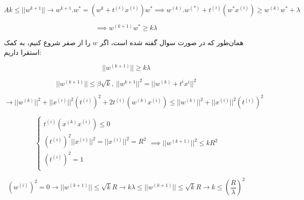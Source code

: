 
$$
Ak \leq ||w^{k + 1}|| \rightarrow w^{k+1}.w^{*} = (w^{k} + t^{(i)}x^{(i)})w^* \implies w^{(k)}.w^{(*)}+t^{(i)}(w^{*}x^{(i)}) \geq w^{(k)}w^* + \lambda 
$$

$$
\implies w^{(k + 1)} w^* \geq k\lambda
$$

همان‌طور که در صورت سوال گفته شده است، اگر $w$ را از صفر شروع کنیم، به کمک استقرا داریم:

$$
||w^{(k + 1)} || \geq k\lambda
$$

$$
||w^{(k + 1)}|| \leq \beta \sqrt{k}, \: ||w^{k + 1}||^2 = ||w^{(k)} + t^{i}x^{i}||^2
$$

$$
\rightarrow ||w^{(k)}||^2 + ||x^{(i)}||^2(t^{(i)})^2 + 2t^{(i)}(w^{(k)}x^{(i)}) \leq ||w^{(k)}||^2 + ||x^{(i)}||^2(t^{(i)})^2
$$

$$
\begin{cases}
	t^{(i)}(x^{(k)}x^{(i)}) \leq 0 \\
	(t^{(i)})^2 ||x^{(i)}||^2 = ||x^{(i)}||^2 = R^2 \\
	(t^{(i)})^2 = 1 \\
\end{cases}
\implies ||w^{(k + 1)}|| ^ 2 \leq kR^2
$$

$$
(w^{(i)})^2 = 0 \rightarrow ||w^{(k + 1)}|| \leq \sqrt{k}R \rightarrow k\lambda \leq ||w^{(k + 1)}|| \leq \sqrt{k}R \rightarrow k \leq (\frac{R}{\lambda})^2
$$
